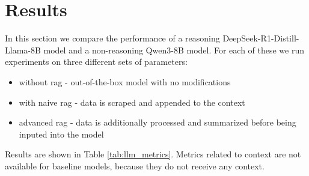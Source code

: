 \documentclass[fleqn,moreauthors,10pt]{ds_report}
\begin{document}
\section*{Results}

In this section we compare the performance of a reasoning DeepSeek-R1-Distill-Llama-8B \cite{deepseek3} model and a non-reasoning Qwen3-8B \cite{qwen3} model. For each of these we run experiments on three different sets of parameters:
\begin{itemize}
	\item without \ac{rag} - out-of-the-box model with no modifications
	\item with naive \ac{rag} - data is scraped and appended to the context
	\item advanced \ac{rag} - data is additionally processed and summarized before being inputed into the model
\end{itemize}

Results are shown in Table \ref{tab:llm_metrics}. Metrics related to context are not available for baseline models, because they do not receive any context. 


\begin{table}[!htb]
{}
\caption{Performance comparison as evaluated by a 14B parameter Qwen model with DeepEval framework.}
\label{tab:llm_metrics}
\end{table}
\end{document}
